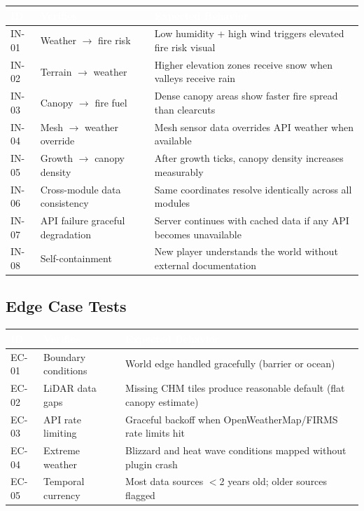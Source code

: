\documentclass[11pt,letterpaper]{article}
\newcommand{\tableheader}[1]{\textbf{\sffamily\textcolor{white}{#1}}}
\begin{document}
\begin{center}
\begin{tabularx}{\textwidth}{C{1.2cm}L{3.5cm}X}
\toprule
{}
\tableheader{ID} & \tableheader{Verifies} & \tableheader{Expected Behavior} \\
\midrule
IN-01 & Weather $\rightarrow$ fire risk & Low humidity + high wind triggers elevated fire risk visual \\
IN-02 & Terrain $\rightarrow$ weather & Higher elevation zones receive snow when valleys receive rain \\
IN-03 & Canopy $\rightarrow$ fire fuel & Dense canopy areas show faster fire spread than clearcuts \\
IN-04 & Mesh $\rightarrow$ weather override & Mesh sensor data overrides API weather when available \\
IN-05 & Growth $\rightarrow$ canopy density & After growth ticks, canopy density increases measurably \\
IN-06 & Cross-module data consistency & Same coordinates resolve identically across all modules \\
IN-07 & API failure graceful degradation & Server continues with cached data if any API becomes unavailable \\
IN-08 & Self-containment & New player understands the world without external documentation \\
\bottomrule
\end{tabularx}
\end{center}

\subsection{Edge Case Tests}

\begin{center}
\begin{tabularx}{\textwidth}{C{1.2cm}L{3.5cm}X}
\toprule
{}
\tableheader{ID} & \tableheader{Verifies} & \tableheader{Expected Behavior} \\
\midrule
EC-01 & Boundary conditions & World edge handled gracefully (barrier or ocean) \\
EC-02 & LiDAR data gaps & Missing CHM tiles produce reasonable default (flat canopy estimate) \\
EC-03 & API rate limiting & Graceful backoff when OpenWeatherMap/FIRMS rate limits hit \\
EC-04 & Extreme weather & Blizzard and heat wave conditions mapped without plugin crash \\
EC-05 & Temporal currency & Most data sources $<$2 years old; older sources flagged \\
\bottomrule
\end{tabularx}
\end{center}
\end{document}
